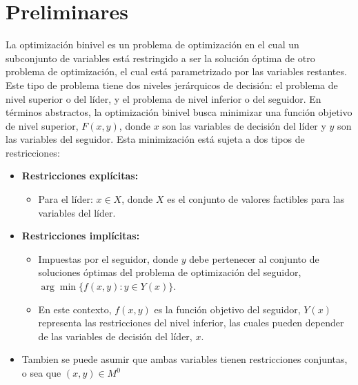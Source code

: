 \chapter{Preliminares}

La optimización binivel es un problema de optimización en el cual un subconjunto de variables está restringido a ser la solución óptima de otro problema de optimización, el cual está parametrizado por las variables restantes. Este tipo de problema tiene dos niveles jerárquicos de decisión: el problema de nivel superior o del líder, y el problema de nivel inferior o del seguidor. 
En términos abstractos, la optimización binivel busca minimizar una función objetivo de nivel superior, $F(x, y)$, donde $x$ son las variables de decisión del líder y $y$ son las variables del seguidor. Esta minimización está sujeta a dos tipos de restricciones: 
\begin{itemize}
    \item \textbf{Restricciones explícitas:}
    \begin{itemize}
        \item Para el líder: $x \in X$, donde $X$ es el conjunto de valores factibles para las variables del líder.
    \end{itemize}
    
    \item \textbf{Restricciones implícitas:}
    \begin{itemize}
        \item Impuestas por el seguidor, donde $y$ debe pertenecer al conjunto de soluciones óptimas del problema de optimización del seguidor, $\arg\min\{f(x, y) : y \in Y(x)\}$.
        \item En este contexto, $f(x, y)$ es la función objetivo del seguidor, $Y(x)$ representa las restricciones del nivel inferior, las cuales pueden depender de las variables de decisión del líder, $x$.
    \end{itemize}
	\item Tambien se puede asumir que ambas variables tienen restricciones conjuntas, o sea que $(x,y) \in M^0$
	 
\end{itemize}


